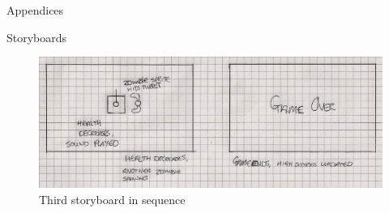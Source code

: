 \documentclass[11pt]{article}
\begin{document}
\begin{landscape}
\begin{section}{Appendices}
\begin{subsection}{Storyboards}
    		\clearpage
    		\begin{figure}[htp]
	    		\vspace{1.8in}
	    		\centering
                    \includegraphics[width=0.8\columnwidth]{img/storyboard_3}
	    		\caption{Third storyboard in sequence}
    		\end{figure}
        \end{subsection}
    \end{section}
\end{landscape}
\end{document}
